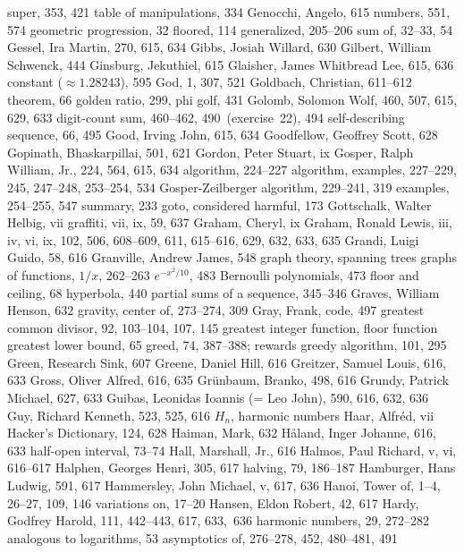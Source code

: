 \sub super, 353, 421
\sub table of manipulations, 334
Genocchi, Angelo, 615
\sub numbers, 551, 574
geometric progression, 32
\sub floored, 114
\sub generalized, 205--206
\sub sum of, 32--33, 54
Gessel, Ira Martin, 270, 615, 634
Gibbs, Josiah Willard, 630
Gilbert, William Schwenck, 444
Ginsburg, Jekuthiel, 615
Glaisher, James Whitbread Lee, 615, 636
\sub constant ($\approx1.28243$), 595
God, 1, 307, 521
Goldbach, Christian, 611--612
\sub theorem, 66
golden ratio, 299, \see phi
golf, 431
Golomb, Solomon Wolf, 460, 507, 615, 629, 633
\sub digit-count sum, 460--462, 490~(exercise~22), 494
\sub self-describing sequence, 66, 495
Good, Irving John, 615, 634
Goodfellow, Geoffrey Scott, 628
Gopinath, Bhaskarpillai, 501, 621
Gordon, Peter Stuart, ix
Gosper, Ralph William, Jr., 224, 564, 615, 634
\sub algorithm, 224--227
\sub algorithm, examples, 227--229, 245, 247--248, 253--254, 534
Gosper-Zeilberger algorithm, 229--241, 319
\sub examples, 254--255, 547
\sub summary, 233
goto, considered harmful, 173
Gottschalk, Walter Helbig, vii
graffiti, vii, ix, 59, 637
Graham, Cheryl, ix
Graham, Ronald Lewis, iii, iv, vi, ix, %
 102, 506, 608--609, 611, 615--616, 629, 632, 633, 635
Grandi, Luigi Guido, 58, 616
Granville, Andrew James, 548
graph theory, \see spanning trees
graphs of functions,
\sub $1/x$, 262--263
\sub $e^{-x^2\!/10}$, 483
\sub Bernoulli polynomials, 473
\sub floor and ceiling, 68
\sub hyperbola, 440
\sub partial sums of a sequence, 345--346
Graves, William Henson, 632
gravity, center of, 273--274, 309
Gray, Frank, code, 497
greatest common divisor, 92, 103--104, 107, 145
greatest integer function, \see floor function
greatest lower bound, 65
greed, 74, 387--388; \also rewards
greedy algorithm, 101, 295
Green, Research Sink, 607
Greene, Daniel Hill, 616
Greitzer, Samuel Louis, 616, 633
Gross, Oliver Alfred, 616, 635
Gr\"unbaum, Branko, 498, 616
Grundy, Patrick Michael, 627, 633
Guibas, Leonidas Ioannis (= Leo John), 590, 616, 632, 636
Guy, Richard Kenneth, 523, 525, 616
\medskip
$H_n$, \see harmonic numbers
Haar, Alfr\'ed, vii
Hacker's Dictionary, 124, 628
Haiman, Mark, 632
H{\aa}land, Inger Johanne, 616, 633
half-open interval, 73--74
Hall, Marshall, Jr., 616
Halmos, Paul Richard, v, vi, 616--617
Halphen, Georges Henri, 305, 617
halving, 79, 186--187
Hamburger, Hans Ludwig, 591, 617
Hammersley, John Michael, v, 617, 636
Hanoi, Tower of, 1--4, 26--27, 109, 146
\sub variations on, 17--20
Hansen, Eldon Robert, 42, 617
Hardy, Godfrey Harold, 111, 442--443, 617, 633,~636
harmonic numbers, 29, 272--282
\sub analogous to logarithms, 53
\sub asymptotics of, 276--278, 452, 480--481, 491
